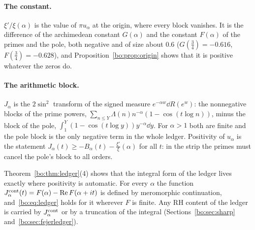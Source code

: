 \paragraph{The constant.} $\xi'/\xi(\alpha)$ is the value of $\pi u_\alpha$ at the origin, where every block vanishes. It is the difference of the archimedean constant $G(\alpha)$ and the constant $F(\alpha)$ of the primes and the pole, both negative and of size about $0.6$ ($G(\frac34)=-0.616$, $F(\frac34)=-0.628$), and Proposition~\ref{bo:prop:origin} shows that it is positive whatever the zeros do.

\paragraph{The arithmetic block.} $J_\alpha$ is the $2\sin^2$ transform of the signed measure $e^{-\alpha w}\dd R(e^w)$: the nonnegative blocks of the prime powers, $\sum_{n\le Y}\Lambda(n)n^{-\alpha}(1-\cos(t\log n))$, minus the block of the pole, $\int_1^Y(1-\cos(t\log y))y^{-\alpha}\dd y$. For $\alpha>1$ both are finite and the pole block is the only negative term in the whole ledger. Positivity of $u_\alpha$ is the statement $J_\alpha(t)\ge-B_\alpha(t)-\frac{\xi'}{\xi}(\alpha)$ for all $t$: in the strip the primes must cancel the pole's block to all orders.

\begin{remark}[Scope]\label{bo:rem:scope}
Theorem~\ref{bo:thm:ledger}(4) shows that the integral form of the ledger lives exactly where positivity is automatic. For every $\alpha$ the function $J^{\rm cont}_\alpha(t)=F(\alpha)-\Re F(\alpha+it)$ is defined by meromorphic continuation, and~\eqref{bo:eq:ledger} holds for it wherever $F$ is finite. Any RH content of the ledger is carried by $J^{\rm cont}_\alpha$ or by a truncation of the integral (Sections~\ref{bo:sec:sharp} and~\ref{bo:sec:fejerledger}).
\end{remark}

